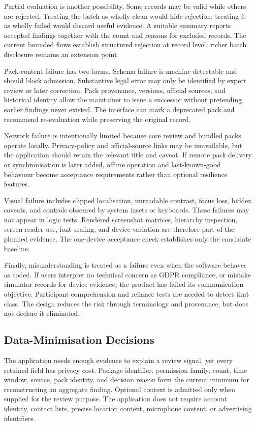 Partial evaluation is another possibility. Some records may be valid while others are rejected. Treating the batch as wholly clean would hide rejection; treating it as wholly failed would discard useful evidence. A suitable summary reports accepted findings together with the count and reasons for excluded records. The current bounded flows establish structured rejection at record level; richer batch disclosure remains an extension point.

Pack-content failure has two forms. Schema failure is machine detectable and should block admission. Substantive legal error may only be identified by expert review or later correction. Pack provenance, versions, official sources, and historical identity allow the maintainer to issue a successor without pretending earlier findings never existed. The interface can mark a deprecated pack and recommend re-evaluation while preserving the original record.

Network failure is intentionally limited because core review and bundled packs operate locally. Privacy-policy and official-source links may be unavailable, but the application should retain the relevant title and caveat. If remote pack delivery or synchronisation is later added, offline operation and last-known-good behaviour become acceptance requirements rather than optional resilience features.

Visual failure includes clipped localisation, unreadable contrast, focus loss, hidden caveats, and controls obscured by system insets or keyboards. These failures may not appear in logic tests. Rendered screenshot matrices, hierarchy inspection, screen-reader use, font scaling, and device variation are therefore part of the planned evidence. The one-device acceptance check establishes only the candidate baseline.

Finally, misunderstanding is treated as a failure even when the software behaves as coded. If users interpret no technical concern as GDPR compliance, or mistake simulator records for device evidence, the product has failed its communication objective. Participant comprehension and reliance tests are needed to detect that class. The design reduces the risk through terminology and provenance, but does not declare it eliminated.

\subsection{Data-Minimisation Decisions}

The application needs enough evidence to explain a review signal, yet every retained field has privacy cost. Package identifier, permission family, count, time window, source, pack identity, and decision reason form the current minimum for reconstructing an aggregate finding. Optional context is admitted only when supplied for the review purpose. The application does not require account identity, contact lists, precise location content, microphone content, or advertising identifiers.

